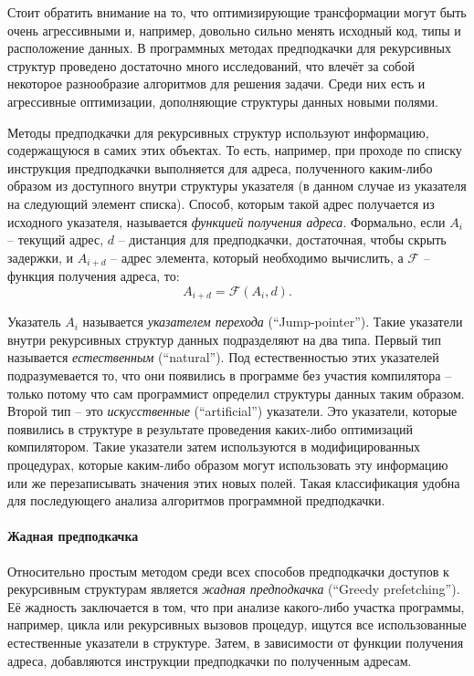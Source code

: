 \documentclass[12pt,a4paper]{article}
\begin{document}
Стоит обратить внимание на то, что оптимизирующие трансформации могут быть очень агрессивными и, например, довольно сильно менять исходный код, типы и расположение данных. В программных методах предподкачки для рекурсивных структур проведено достаточно много исследований, что влечёт за собой некоторое разнообразие алгоритмов для решения задачи. Среди них есть и агрессивные оптимизации, дополняющие структуры данных новыми полями.

Методы предподкачки для рекурсивных структур используют информацию, содержащуюся в самих этих объектах. То есть, например, при проходе по списку инструкция предподкачки выполняется для адреса, полученного каким-либо образом из доступного внутри структуры указателя (в данном случае из указателя на следующий элемент списка). Способ, которым такой адрес получается из исходного указателя, называется \emph{функцией получения адреса}. Формально, если $A_i$ -- текущий адрес, $d$ -- дистанция для предподкачки, достаточная, чтобы скрыть задержки, и $A_{i+d}$ -- адрес элемента, который необходимо вычислить, а $\mathcal{F}$ -- функция получения адреса, то:
\begin{displaymath}
  A_{i+d} = \mathcal{F}(A_i,d).
\end{displaymath}

Указатель $A_i$ называется \emph{указателем перехода} (``Jump-pointer''). Такие указатели внутри рекурсивных структур данных подразделяют на два типа. Первый тип называется \emph{естественным} (``natural''). Под естественностью этих указателей подразумевается то, что они появились в программе без участия компилятора -- только потому что сам программист определил структуры данных таким образом. Второй тип -- это \emph{искусственные} (``artificial'') указатели. Это указатели, которые появились в структуре в результате проведения каких-либо оптимизаций компилятором. Такие указатели затем используются в модифицированных процедурах, которые каким-либо образом могут использовать эту информацию или же перезаписывать значения этих новых полей. Такая классификация удобна для последующего анализа алгоритмов программной предподкачки.

\paragraph{Жадная предподкачка}

Относительно простым методом среди всех способов предподкачки доступов к рекурсивным структурам является \emph{жадная предподкачка} (``Greedy prefetching''). Её жадность заключается в том, что при анализе какого-либо участка программы, например, цикла или рекурсивных вызовов процедур, ищутся все использованные естественные указатели в структуре. Затем, в зависимости от функции получения адреса, добавляются инструкции предподкачки по полученным адресам.
\end{document}
